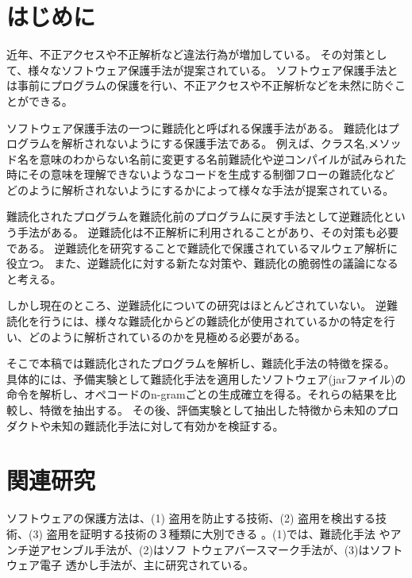 \documentclass[12pt,twoside]{jreport}
\begin{document}
\listoffigures         %
\listoftables          %


%
%
%
\chapter{はじめに}

近年、不正アクセスや不正解析など違法行為が増加している。
その対策として、様々なソフトウェア保護手法が提案されている。
ソフトウェア保護手法とは事前にプログラムの保護を行い、不正アクセスや不正解析などを未然に防ぐことができる。

ソフトウェア保護手法の一つに難読化と呼ばれる保護手法がある。
難読化はプログラムを解析されないようにする保護手法である。
例えば、クラス名,メソッド名を意味のわからない名前に変更する名前難読化や逆コンパイルが試みられた時にその意味を理解できないようなコードを生成する制御フローの難読化など
どのように解析されないようにするかによって様々な手法が提案されている。


難読化されたプログラムを難読化前のプログラムに戻す手法として逆難読化という手法がある。
逆難読化は不正解析に利用されることがあり、その対策も必要である。
逆難読化を研究することで難読化で保護されているマルウェア解析に役立つ。
また、逆難読化に対する新たな対策や、難読化の脆弱性の議論になると考える。

しかし現在のところ、逆難読化についての研究はほとんどされていない。
逆難読化を行うには、様々な難読化からどの難読化が使用されているかの特定を行い、どのように解析されているのかを見極める必要がある。

そこで本稿では難読化されたプログラムを解析し、難読化手法の特徴を探る。
具体的には、予備実験として難読化手法を適用したソフトウェア(jarファイル)の命令を解析し、オペコードのn-gramごとの生成確立を得る。それらの結果を比較し、特徴を抽出する。
その後、評価実験として抽出した特徴から未知のプロダクトや未知の難読化手法に対して有効かを検証する。


\chapter{関連研究}\label{sect:related}
ソフトウェアの保護方法は、(1) 盗用を防止する技術、(2) 盗用を検出する技
術、(3) 盗用を証明する技術の３種類に大別できる
\cite{collberg09surreptitious}。(1)では、難読化手法
\cite{tyma00patent,monden97ieice}やアンチ逆アセンブル手法が、(2)はソフ
トウェアバースマーク手法\cite{tamada05ieice}が、(3)はソフトウェア電子
透かし手法\cite{collberg99popl}が、主に研究されている。
\end{document}
